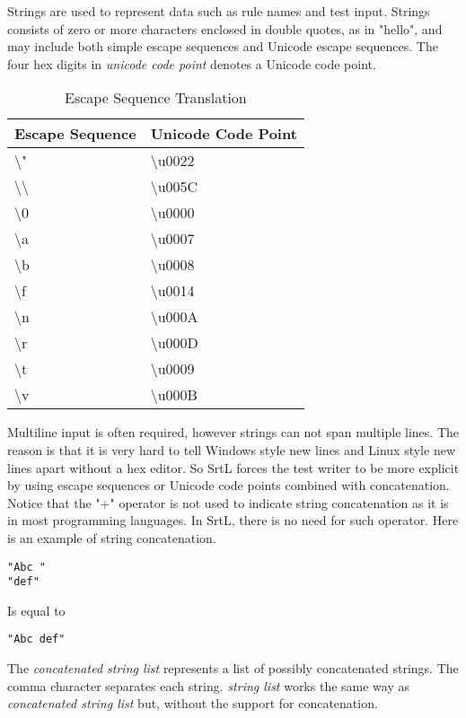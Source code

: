 

Strings are used to represent data such as rule names and test input. Strings 
consists of zero or more characters enclosed in double quotes, as in "hello", 
and may include both simple escape sequences and Unicode escape sequences.
The four hex digits in \textit{unicode code point} denotes a Unicode code point.

\begin{table}[h]
    \centering
    \caption{Escape Sequence Translation}
        \begin{tabular}{|l|l|}
        \hline
        \textbf{Escape Sequence}     & \textbf{Unicode Code Point}  \\ \hline
        \textbackslash"              & \textbackslash u0022         \\ \hline
        \textbackslash\textbackslash & \textbackslash u005C         \\ \hline
        \textbackslash 0             & \textbackslash u0000         \\ \hline
        \textbackslash a             & \textbackslash u0007         \\ \hline
        \textbackslash b             & \textbackslash u0008         \\ \hline
        \textbackslash f             & \textbackslash u0014         \\ \hline
        \textbackslash n             & \textbackslash u000A         \\ \hline
        \textbackslash r             & \textbackslash u000D         \\ \hline
        \textbackslash t             & \textbackslash u0009         \\ \hline
        \textbackslash v             & \textbackslash u000B         \\ \hline
    \end{tabular}
\end{table}

Multiline input is often required, however strings can not span multiple lines. 
The reason is that it is very hard to tell Windows style new lines and Linux 
style new lines apart without a hex editor. So SrtL forces the test writer to be
more explicit by using escape sequences or Unicode code points combined with 
concatenation. Notice that the "+" operator is not used to indicate string 
concatenation as it is in most programming languages. In SrtL, there is no need
for such operator. Here is an example of string concatenation.

\begin{lstlisting}[style = SrtL]
"Abc "
"def"
\end{lstlisting}

Is equal to 

\begin{lstlisting}[style = SrtL]
"Abc def"
\end{lstlisting}

The \textit{concatenated string list} represents a list of possibly 
concatenated strings. The comma character separates each string. 
\textit{string list} works the same way as \textit{concatenated string list} 
but, without the support for concatenation.
